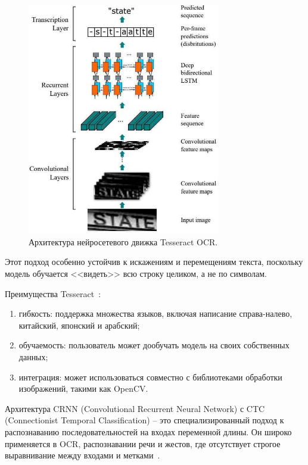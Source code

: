 \begin{figure}[H]
    \centering
    \includegraphics[width=0.75\textwidth]{imgs/theory/TesseractOCR.png}
    \caption{Архитектура нейросетевого движка Tesseract OCR.}
    \label{fig:tesseract}
\end{figure}
\vspace{-0.85cm}

Этот подход особенно устойчив к искажениям и перемещениям текста, поскольку 
модель обучается <<видеть>> всю строку целиком, а не по символам.

Преимущества Tesseract~\cite{tesseractbook}:

\begin{enumerate}
    \item гибкость: поддержка множества языков, включая написание справа-налево, 
    китайский, японский и арабский;
    \item обучаемость: пользователь может дообучать модель на своих собственных 
    данных;
    \item интеграция: может использоваться совместно с библиотеками обработки 
    изображений, такими как OpenCV.
\end{enumerate}

Архитектура CRNN (Convolutional Recurrent Neural Network) с CTC (Connectionist 
Temporal Classification) -- это специализированный подход к распознаванию 
последовательностей на входах переменной длины. Он широко применяется в OCR, 
распознавании речи и жестов, где отсутствует строгое выравнивание между входами 
и метками~\cite{crnnbook}.

